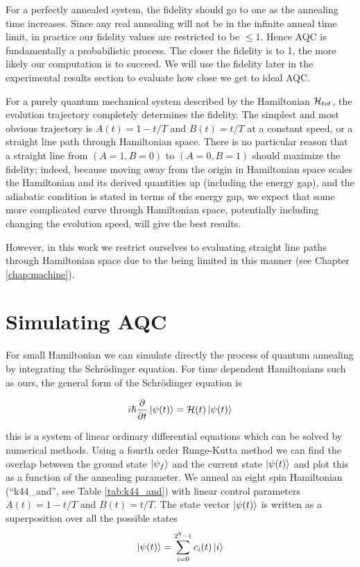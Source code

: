 For a perfectly annealed system, the fidelity should go to one as the annealing time increases.  Since any real annealing will not be in the infinite anneal time limit, in practice our fidelity values are restricted to be $\leq 1$.  Hence AQC is fundamentally a probabilistic process.  The closer the fidelity is to 1, the more likely our computation is to succeed.  We will use the fidelity later in the experimental results section to evaluate how close we get to ideal AQC.

For a purely quantum mechanical system described by the Hamiltonian $\mathcal{H}_{tot}$, the evolution trajectory completely determines the fidelity.
The simplest and most obvious trajectory is $A(t) = 1 - t/T$ and $B(t) = t/T$ at a constant speed, or a straight line path through Hamiltonian space.
There is no particular reason that a straight line from $(A=1,B=0)$ to $(A=0,B=1)$ should maximize the fidelity; indeed, because moving away from the origin in Hamiltonian space scales the Hamiltonian and its derived quantities up (including the energy gap), and the adiabatic condition is stated in terms of the energy gap, we expect that some more complicated curve through Hamiltonian space, potentially including changing the evolution speed, will give the best results.

However, in this work we restrict ourselves to evaluating straight line paths through Hamiltonian space due to the \machine being limited in this manner (see Chapter \ref{chap:machine}).

\section{Simulating AQC}
For small Hamiltonian we can simulate directly the process of quantum annealing by integrating the Schr\"odinger equation. For time dependent Hamiltonians such as ours, the general form of the Schr\"odinger equation is 

\begin{equation}
	i\hbar\frac{\partial}{\partial t} \mathinner{|{\psi(t)}\rangle} = \mathcal{H}(t)\mathinner{|{\psi(t)}\rangle}
	\label{eq:num_int}
\end{equation}

this is a system of linear ordinary differential equations which can be solved by numerical methods.  Using a fourth order Runge-Kutta method\cite{comp_book} we can find the overlap between the ground state $\mathinner{|{\psi_f}\rangle}$ and the current state $\mathinner{|{\psi(t)}\rangle}$ and plot this as a function of the annealing parameter.  We anneal an eight spin Hamiltonian (``k44\_and'', see Table \ref{tab:k44_and}) with linear control parameters $A(t) = 1-t/T$ and $B(t) = t/T$.  The state vector $\mathinner{|{\psi(t)}\rangle}$ is written as a superposition over all the possible states
\begin{equation}
	\mathinner{|{\psi(t)}\rangle} = \sum_{i=0}^{2^8-1} c_i(t)\mathinner{|{i}\rangle}
\end{equation}

